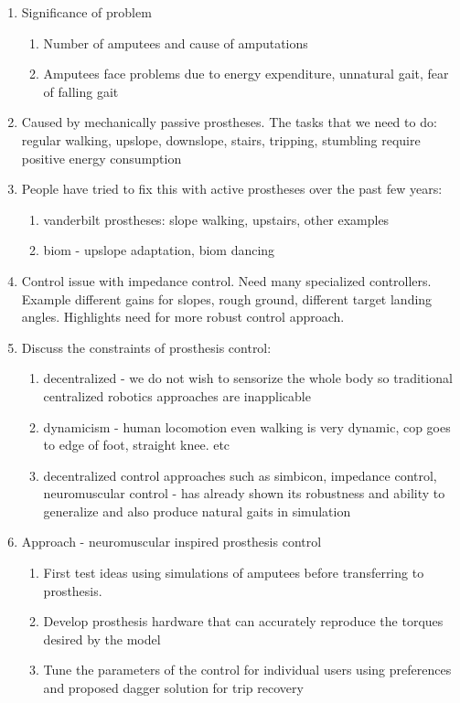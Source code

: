 \begin{enumerate}
    \item Significance of problem
    \begin{enumerate}
        \item Number of amputees and cause of amputations
        \item Amputees face problems due to energy expenditure, unnatural gait,
            fear of falling gait
    \end{enumerate}
    \item Caused by mechanically passive prostheses. The tasks that we need to
    do: regular walking, upslope, downslope, stairs, tripping, stumbling require
    positive energy consumption

    \item People have tried to fix this with active prostheses over the past few
    years:
    \begin{enumerate}
        \item vanderbilt prostheses: slope walking, upstairs, other examples
        \item biom - upslope adaptation, biom dancing
    \end{enumerate}

    \item Control issue with impedance control.  Need many specialized
    controllers. Example different gains for slopes, rough ground, different
    target landing angles. Highlights need for more robust control approach.

    \item Discuss the constraints of prosthesis control:
    \begin{enumerate}
        \item decentralized - we do not wish to sensorize the whole body so
            traditional centralized robotics approaches are inapplicable
        \item dynamicism - human locomotion even walking is very dynamic, cop
        goes to edge of foot, straight knee. etc
        \item decentralized control approaches such as simbicon, impedance
        control, neuromuscular control - has already shown its robustness and
        ability to generalize and also produce natural gaits in simulation
    \end{enumerate}

    \item Approach - neuromuscular inspired prosthesis control
    \begin{enumerate}
        \item First test ideas using simulations of amputees before transferring
        to prosthesis. 
        \item Develop prosthesis hardware that can accurately reproduce the
        torques desired by the model
        \item Tune the parameters of the control for individual users using
        preferences and proposed dagger solution for trip recovery
    \end{enumerate}


\end{enumerate}
